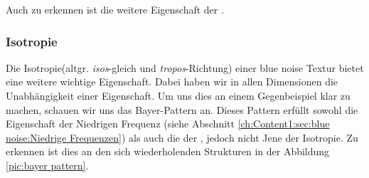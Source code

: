 Auch zu erkennen ist die weitere Eigenschaft der .

\subsubsection{Isotropie}
\label{ch:Content1:sec:blue noise:Isotropie}

Die Isotropie(altgr. \textit{isos}-gleich und \textit{tropos}-Richtung)
einer blue noise Textur bietet eine weitere wichtige Eigenschaft. Dabei haben wir in allen Dimensionen
die Unabhängigkeit einer Eigenschaft. Um uns dies an einem Gegenbeispiel 
klar zu machen, schauen wir uns das Bayer-Pattern an. Dieses Pattern erfüllt sowohl 
die Eigenschaft der Niedrigen Frequenz (siehe Abschnitt \ref{ch:Content1:sec:blue noise:Niedrige Frequenzen}) als auch 
die der , jedoch nicht Jene der Isotropie.
Zu erkennen ist dies an den sich wiederholenden Strukturen in der Abbildung \ref{pic:bayer pattern}.

